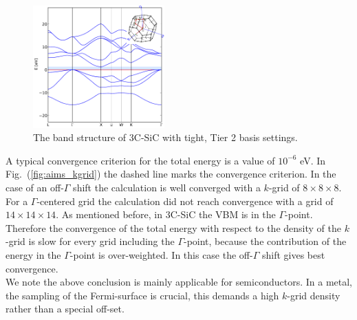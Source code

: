 %
\newpage
%
\begin{figure}
\centering
\includegraphics[width=0.45\textwidth]{./3C-SiC_bands.pdf}
 \caption{The band structure of 3C-SiC with tight, Tier 2 basis settings.}
 \label{fig:3C-SiC_bands}
\end{figure}%
%
A typical convergence criterion for the total energy is a value of $10^{-6}$ eV. In Fig.~(\ref{fig:aims_kgrid}) the dashed line marks the convergence criterion. In the case of an off-$\Gamma$ shift the calculation is well converged with a $k$-grid of $8 \times 8 \times 8$. For a $\Gamma$-centered grid the calculation did not reach convergence with a grid of $14 \times 14 \times 14$. As mentioned before, in 3C-SiC the VBM is in the $\Gamma$-point. Therefore the convergence of the total energy with respect to the density of the $k$-grid is slow for every grid including the $\Gamma$-point, because the contribution of the energy in the $\Gamma$-point is over-weighted. 
In this case the off-$\Gamma$ shift gives best convergence.\\
We note the above conclusion is mainly applicable for semiconductors. In a metal, the sampling of the Fermi-surface is crucial, this demands a high $k$-grid density rather than a special off-set.  


